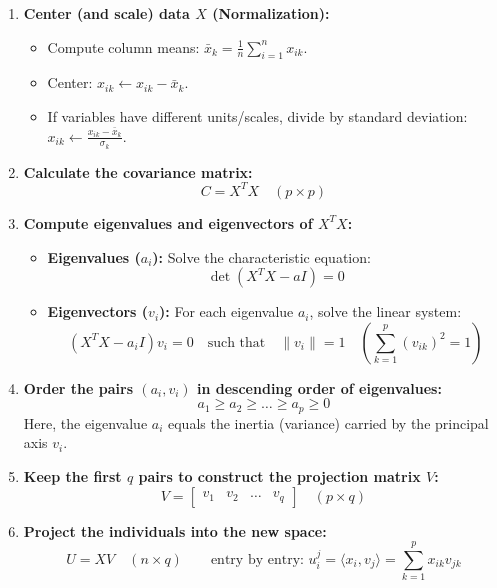 \documentclass[10pt,a4paper]{article}
\begin{document}
\begin{enumerate}[leftmargin=18pt, itemsep=4pt, topsep=2pt]
    \item \textbf{Center (and scale) data $X$ (Normalization):}
    \begin{itemize}[leftmargin=12pt, itemsep=2pt]
        \item Compute column means: $\bar{x}_k = \frac{1}{n}\sum_{i=1}^n x_{ik}$.
        \item Center: $x_{ik} \leftarrow x_{ik} - \bar{x}_k$.
        \item If variables have different units/scales, divide by standard deviation: $x_{ik} \leftarrow \frac{x_{ik} - \bar{x}_k}{\sigma_k}$.
    \end{itemize}

    \item \textbf{Calculate the covariance matrix:}
    \[
    C = X^T X \quad (p \times p)
    \]

    \item \textbf{Compute eigenvalues and eigenvectors of $X^T X$:}
    \begin{itemize}[leftmargin=12pt, itemsep=3pt]
        \item \textbf{Eigenvalues ($a_i$):} Solve the characteristic equation:
        \[
        \det(X^T X - a I) = 0
        \]
        \item \textbf{Eigenvectors ($v_i$):} For each eigenvalue $a_i$, solve the linear system:
        \[
        (X^T X - a_i I) v_i = 0 \quad \text{such that} \quad \|v_i\| = 1 \quad \left(\sum_{k=1}^p (v_{ik})^2 = 1\right)
        \]
    \end{itemize}

    \item \textbf{Order the pairs $(a_i, v_i)$ in descending order of eigenvalues:}
    \[
    a_1 \ge a_2 \ge \dots \ge a_p \ge 0
    \]
    Here, the eigenvalue $a_i$ equals the inertia (variance) carried by the principal axis $v_i$.

    \item \textbf{Keep the first $q$ pairs to construct the projection matrix $V$:}
    \[
    V = \begin{bmatrix} v_1 & v_2 & \dots & v_q \end{bmatrix} \quad (p \times q)
    \]

    \item \textbf{Project the individuals into the new space:}
    \[
    U = X V \quad (n \times q) \qquad \text{entry by entry: } u_i^j = \langle x_i, v_j \rangle = \sum_{k=1}^p x_{ik} v_{jk}
    \]
\end{enumerate}
\end{document}
